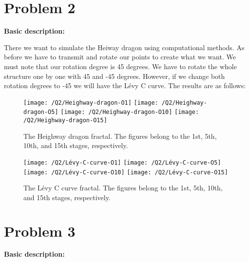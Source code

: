\documentclass{article}
\begin{document}
    \section*{Problem 2}
    \textbf{Basic description:}

    There we want to simulate the Heiway dragon using computational methods.
    As before we have to transmit and rotate our points to create what we want.
    We must note that our rotation degree is 45 degrees.
    We have to rotate the whole structure one by one with 45 and -45 degrees.
    However, if we change both rotation degrees to -45 we will have the Lévy C curve.
    The results are as follows:
    \begin{figure}[!htb]
        \centering
        \texttt{[image: /Q2/Heighway-dragon-O1]}
        \label{fig:2.1.1}
        \texttt{[image: /Q2/Heighway-dragon-O5]}
        \label{fig:2.1.2}
        \texttt{[image: /Q2/Heighway-dragon-O10]}
        \label{fig:2.1.3}
        \texttt{[image: /Q2/Heighway-dragon-O15]}
        \label{fig:2.1.3}
        \caption{The Heighway dragon fractal. The figures belong to the 1st, 5th, 10th, and 15th stages, respectively.}
    \end{figure}
    \begin{figure}[!htb]
        \centering
        \texttt{[image: /Q2/Lévy-C-curve-O1]}
        \label{fig:2.2.1}
        \texttt{[image: /Q2/Lévy-C-curve-O5]}
        \label{fig:2.2.2}
        \texttt{[image: /Q2/Lévy-C-curve-O10]}
        \label{fig:2.2.3}
        \texttt{[image: /Q2/Lévy-C-curve-O15]}
        \label{fig:2.2.3}
        \caption{The Lévy C curve fractal. The figures belong to the 1st, 5th, 10th, and 15th stages, respectively.}
    \end{figure}
    \section*{Problem 3}
    \textbf{Basic description:}
\end{document}
